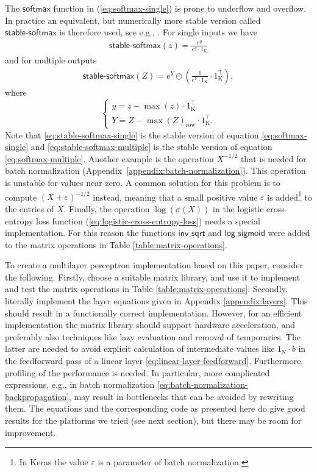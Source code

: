 \documentclass[twoside,11pt]{article}
\newcommand{\const}[1]{\ensuremath{\mathrm{#1}}} %
\newcommand{\func}[1]{\ensuremath{\textsf{#1}}} %
\begin{document}
The \func{softmax} function in (\ref{eq:softmax-single}) is prone to underflow and overflow. In practice an equivalent, but numerically more stable version called \func{stable-softmax} is therefore used, see e.g., \citep{10.1093/imanum/draa038}. For single inputs we have
\begin{align}
\label{eq:stable-softmax-single}
\func{stable-softmax}(z) = \frac{e^y}{e^y \cdot 1_\const{K}}
\end{align}
and for multiple outputs
\begin{align}
\label{eq:stable-softmax-multiple}
\func{stable-softmax}(Z) = e^Y \odot \left( \frac{1}{e^Y \cdot 1_\const{K}}  \cdot 1_\const{K}^\top \right),
\end{align}
where
\[
    \begin{cases*}
    y = z - \max(z) \cdot 1_\const{K}^\top
    \\
    Y = Z - \max(Z)_\text{row} \cdot 1_\const{K}^\top.
    \end{cases*}
\]
Note that
\ref{eq:stable-softmax-single}
is the stable version of equation
\ref{eq:softmax-single}
and
\ref{eq:stable-softmax-multiple}
is the stable version of equation
\ref{eq:softmax-multiple}.
Another example is the operation $X^{-1/2}$ that is needed for batch normalization (Appendix~\ref{appendix:batch-normalization}). This operation is unstable for values near zero.
A common solution for this problem is to compute $(X + \varepsilon)^{-1/2}$ instead, meaning that a small positive value $\varepsilon$ is added\footnote{In Keras the value $\varepsilon$ is a parameter of batch normalization. } to the entries of $X$. Finally, the operation $\log(\sigma(X))$ in the logistic cross-entropy loss function
(\ref{eq:logistic-cross-entropy-loss}) needs a special implementation. For this reason the functions \func{inv\_sqrt} and \func{log\_sigmoid} were added to the matrix operations in Table \ref{table:matrix-operations}.

To create a multilayer perceptron implementation based on this paper, consider the following.
Firstly, choose a suitable matrix library, and use it to implement and test the matrix operations in Table \ref{table:matrix-operations}. Secondly, literally implement the layer equations given in Appendix \ref{appendix:layers}. This should result in a functionally correct implementation.
However, for an efficient implementation the matrix library should support hardware acceleration, and preferably also techniques like lazy evaluation and removal of temporaries. The latter are needed to avoid explicit calculation of intermediate values like $1_\const{N} \cdot b$ in the feedforward pass of a linear layer \eqref{eq:linear-layer-feedforward}. Furthermore, profiling of the performance is needed. In particular, more complicated expressions, e.g., in batch normalization \eqref{eq:batch-normalization-backpropagation}, may result in bottlenecks that can be avoided by rewriting them.
The equations and the corresponding code as presented here do give good results for the platforms we tried (see next section), but there may be room for improvement.
\end{document}
